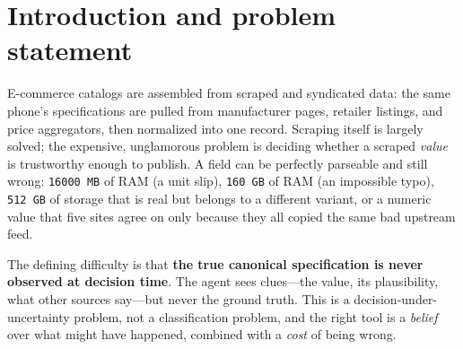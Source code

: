 \documentclass[11pt]{article}
\begin{document}
\begin{abstract}
(b) the most \emph{informative} clue is not the best \emph{buy} once cost enters (the
manufacturer proxy leads on raw bits but a cheaper cross-source panel wins on
bits-per-cost); and (c) under our own cost matrix \emph{every} candidate clue has
\emph{zero} value of information---the guaranteed human-review cost (\textsc{flag}$=2$)
is such a strong ceiling that the agent should flag, not buy, and we show by
prediction-and-test that even making the human much more expensive does \emph{not}
rescue buying on this high-entropy case (VOI plateaus below the clue cost), because no
single clue can concentrate belief enough to escape into a cheaper action. All priors, likelihoods, and costs are author-stated assumptions with recorded
provenance; three adversarial AI reviews and five human discussions shaped the design
and are documented alongside.
\end{abstract}

\tableofcontents

\section{Introduction and problem statement}
\label{sec:intro}

E-commerce catalogs are assembled from scraped and syndicated data: the same phone's
specifications are pulled from manufacturer pages, retailer listings, and price
aggregators, then normalized into one record. Scraping itself is largely solved; the
expensive, unglamorous problem is deciding whether a scraped \emph{value} is
trustworthy enough to publish. A field can be perfectly parseable and still wrong:
\texttt{16000\,MB} of RAM (a unit slip), \texttt{160\,GB} of RAM (an impossible
typo), \texttt{512\,GB} of storage that is real but belongs to a different variant,
or a numeric value that five sites agree on only because they all copied the same bad
upstream feed.

The defining difficulty is that \textbf{the true canonical specification is never
observed at decision time}. The agent sees clues---the value, its plausibility, what
other sources say---but never the ground truth. This is a decision-under-uncertainty
problem, not a classification problem, and the right tool is a \emph{belief} over what
might have happened, combined with a \emph{cost} of being wrong.
\end{document}
